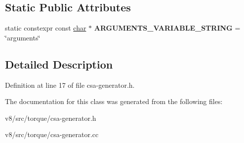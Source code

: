 \subsection*{Static Public Attributes}
\begin{DoxyCompactItemize}
\item 
\mbox{\label{classv8_1_1internal_1_1torque_1_1CSAGenerator_a9d9173c20c9ac48374068fed62775e2b}} 
static constexpr const \mbox{\hyperlink{classchar}{char}} $\ast$ {\bfseries A\+R\+G\+U\+M\+E\+N\+T\+S\+\_\+\+V\+A\+R\+I\+A\+B\+L\+E\+\_\+\+S\+T\+R\+I\+NG} = \char`\"{}arguments\char`\"{}
\end{DoxyCompactItemize}


\subsection{Detailed Description}


Definition at line 17 of file csa-\/generator.\+h.



The documentation for this class was generated from the following files\+:\begin{DoxyCompactItemize}
\item 
v8/src/torque/csa-\/generator.\+h\item 
v8/src/torque/csa-\/generator.\+cc\end{DoxyCompactItemize}
